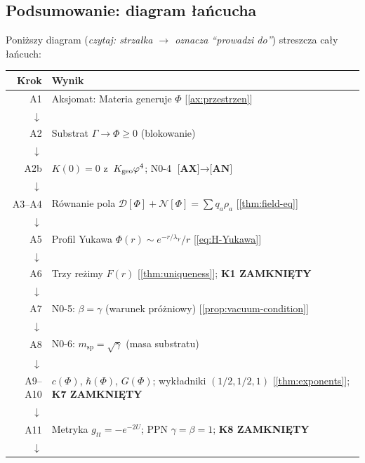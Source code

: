 \subsection{Podsumowanie: diagram \l{}a\'ncucha}%
\label{app:H-diagram}

Poni\.zszy diagram (\emph{czytaj: strza\l{}ka $\to$ oznacza
``prowadzi do''}) streszcza ca\l{}y \l{}a\'ncuch:

\begin{center}
\small
\begin{tabular}{@{}rl@{}}
\toprule
\textbf{Krok} & \textbf{Wynik} \\
\midrule
A1 & Aksjomat: Materia generuje $\Phi$ [\ref{ax:przestrzen}] \\
$\downarrow$ & \\
A2 & Substrat $\Gamma \to \Phi \geq 0$ (blokowanie) \\
$\downarrow$ & \\
A2b & $K(0)=0$ z~$K_{\rm geo}\varphi^4$; N0-4 $\textbf{[AX]}\to\textbf{[AN]}$ \\
$\downarrow$ & \\
A3--A4 & R\'ownanie pola $\mathcal{D}[\Phi] + \mathcal{N}[\Phi]
         = \sum q_a\rho_a$ [\ref{thm:field-eq}] \\
$\downarrow$ & \\
A5 & Profil Yukawa $\Phi(r) \sim e^{-r/\lambda_Y}/r$ [\ref{eq:H-Yukawa}] \\
$\downarrow$ & \\
A6 & Trzy re\.zimy $F(r)$ [\ref{thm:uniqueness}]; \textbf{K1 ZAMKNI\k{E}TY} \\
$\downarrow$ & \\
A7 & N0-5: $\beta = \gamma$ (warunek pr\'o\.zniowy) [\ref{prop:vacuum-condition}] \\
$\downarrow$ & \\
A8 & N0-6: $m_{\mathrm{sp}} = \sqrt{\gamma}$ (masa substratu) \\
$\downarrow$ & \\
A9--A10 & $c(\Phi)$, $\hbar(\Phi)$, $G(\Phi)$; wyk\l{}adniki $(1/2, 1/2, 1)$
         [\ref{thm:exponents}]; \textbf{K7 ZAMKNI\k{E}TY} \\
$\downarrow$ & \\
A11 & Metryka $g_{tt} = -e^{-2U}$; PPN $\gamma = \beta = 1$;
      \textbf{K8 ZAMKNI\k{E}TY} \\
$\downarrow$ & \\

\end{tabular}
\end{center}
